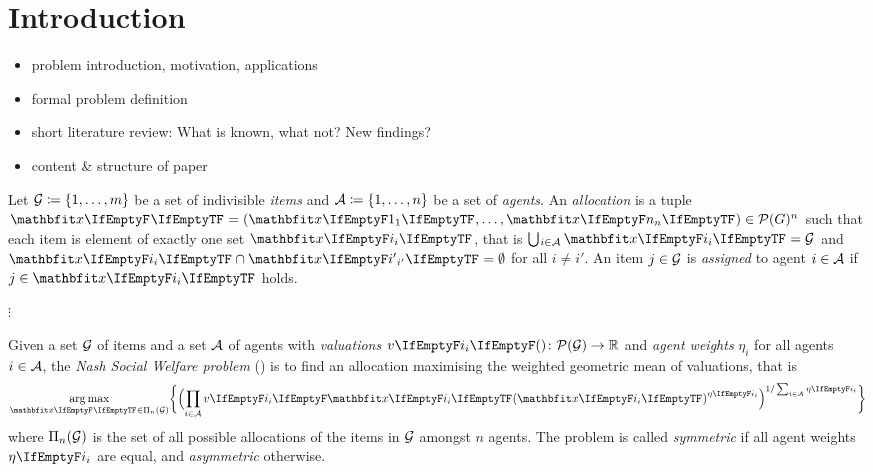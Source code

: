 \section{Introduction}
\label{sec:intro}

\begin{itemize}
	\item
	problem introduction, motivation, applications

	\item
	formal problem definition

	\item
	short literature review: What is known, what not? New findings?

	\item
	content \& structure of paper
\end{itemize}

\begin{definition}
	Let \(\mathcal{G} \coloneq \{1, \dots, m\}\) be a set of indivisible \emph{items} and \(\mathcal{A} \coloneq \{1, \dots, n\}\) be a set of \emph{agents}.
	An \emph{allocation} is a tuple \(\alloc[][] = ( \alloc[][1], \dots, \alloc[][n] ) \in \powerset[G]^n\) such that each item is element of exactly one set \(\alloc\), that is \(\mathop{\bigcup\hspace{-1pt}_{i \in \agents}} \alloc = \goods\) and \(\alloc \cap \alloc[][i'] = \emptyset\) for all \(i \neq i'\).
	An item \(j \in \mathcal{G}\) is \emph{assigned} to agent \(i \in \mathcal{A}\) if \(j \in \alloc\) holds.
\end{definition}

\(\vdots\)

\begin{definition}
	Given a set \(\mathcal{G}\) of items and a set \(\mathcal{A}\) of agents with \emph{valuations} \(\valuations \colon \powerset[\goods] \to \real\) and \emph{agent weights} \(\eta_i\) for all agents \(i \in \mathcal{A}\), the \emph{Nash Social Welfare problem} (\NSW) is to find an allocation maximising the weighted geometric mean of valuations, that is
	\begin{equation*}
		\argmax_{\alloc[][] \in \allallocs{n}{\goods}} \braces[\bigg]{ \paren[\Big]{ \prod_{i \in \agents} \valuations[\alloc]^{\weight} }^{1 / \sum_{i \in \agents} \weight} }
	\end{equation*}
	where \(\Pi_{n}(\mathcal{G})\) is the set of all possible allocations of the items in \(\mathcal{G}\) amongst \(n\) agents.
	The problem is called \emph{symmetric} if all agent weights \(\weight\) are equal, and \emph{asymmetric} otherwise.
\end{definition}

